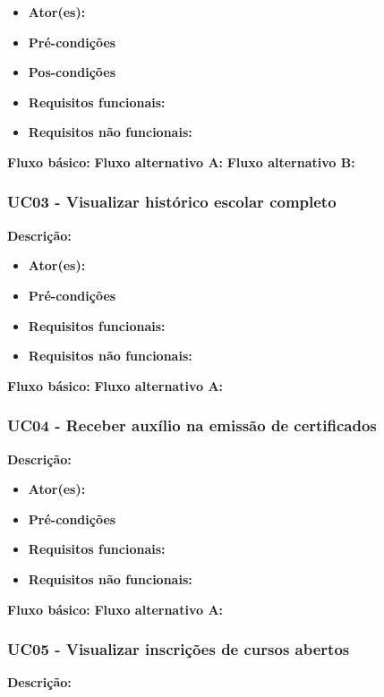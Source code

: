 \begin{itemize}
    \item \textbf{Ator(es):}
    \item \textbf{Pré-condições}
    \item \textbf{Pos-condições}
    \item \textbf{Requisitos funcionais:}
    \item \textbf{Requisitos não funcionais:}
\end{itemize}

\textbf{Fluxo básico:}
\textbf{Fluxo alternativo A:}
\textbf{Fluxo alternativo B:}

\subsubsection{UC03 - Visualizar histórico escolar completo}
\textbf{Descrição:}

\begin{itemize}
    \item \textbf{Ator(es):}
    \item \textbf{Pré-condições}
    \item \textbf{Requisitos funcionais:}
    \item \textbf{Requisitos não funcionais:}
\end{itemize}

\textbf{Fluxo básico:}
\textbf{Fluxo alternativo A:}

\subsubsection{UC04 - Receber auxílio na emissão de certificados}
\textbf{Descrição:}

\begin{itemize}
    \item \textbf{Ator(es):}
    \item \textbf{Pré-condições}
    \item \textbf{Requisitos funcionais:}
    \item \textbf{Requisitos não funcionais:}
\end{itemize}

\textbf{Fluxo básico:}
\textbf{Fluxo alternativo A:}

\subsubsection{UC05 - Visualizar inscrições de cursos abertos}
\textbf{Descrição:}

